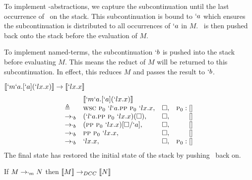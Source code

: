 To implement \lmu-abstractions, we capture the subcontinuation until the last occurrence of \gp\ on the stack.
This subcontinuation is bound to $`a$ which ensures the subcontinuation is distributed to all occurrences of $`a$ in $M$.
\gp\ is then pushed back onto the stack before the evaluation of $M$.

To implement named-terms, the subcontinuation $`b$ is pushed into the stack before evaluating $M$.
This means the reduct of $M$ will be returned to this subcontinuation.
In effect, this reduces $M$ and passes the result to $`b$. 

\begin{example}{$\llbracket `m`a.[`a](`lx.x) \rrbracket \to \llbracket `lx.x \rrbracket$}
\[
\begin{array}{llrr}
             & \llbracket `m`a.[`a](`lx.x) \rrbracket  \\
  \triangleq & \textsc{wsc}\ \textsc{p$_0$}\ `l`a.\textsc{pp}\ \textsc{p$_0$}\ `lx.x, & \square, & \textsc{p$_0$}:[] \\
  \to_{`b}     & (`l`a.\textsc{pp}\ \textsc{p$_0$}\ `lx.x)(\square), & \square, & [] \\
  \to_{`b}     & (\textsc{pp}\ \textsc{p$_0$}\ `lx.x)[\square/`a],   & \square, & [] \\
  \to_{`b}     & \textsc{pp}\ \textsc{p$_0$}\ `lx.x,                 & \square, & [] \\
  \to_{`b}     & `lx.x,                           & \square, & \textsc{p$_0$}:[]
\end{array}   
\]
The final state has restored the initial state of the stack by pushing \gp\ back on.
\end{example}


\begin{theorem}
If $M \rightarrow_{`m} N$ then $\llbracket M \rrbracket \rightarrow_{DCC} \llbracket N \rrbracket$
\end{theorem}

